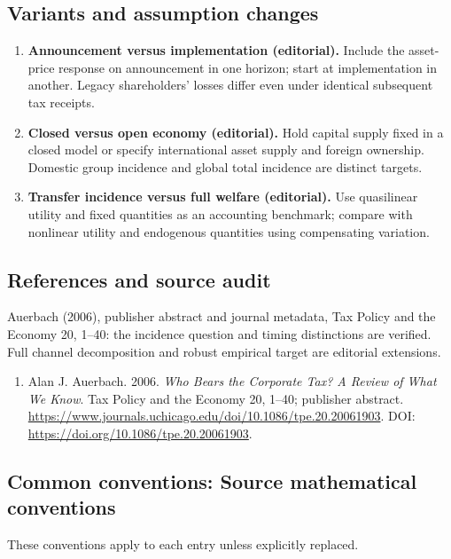 \documentclass[11pt,a4paper]{article}
\begin{document}
\subsection*{Variants and assumption changes}
\begin{enumerate}
\item \textbf{Announcement versus implementation (editorial).} Include the asset-price response on announcement in one horizon; start at implementation in another. Legacy shareholders' losses differ even under identical subsequent tax receipts.
\item \textbf{Closed versus open economy (editorial).} Hold capital supply fixed in a closed model or specify international asset supply and foreign ownership. Domestic group incidence and global total incidence are distinct targets.
\item \textbf{Transfer incidence versus full welfare (editorial).} Use quasilinear utility and fixed quantities as an accounting benchmark; compare with nonlinear utility and endogenous quantities using compensating variation.
\end{enumerate}
\subsection*{References and source audit}
Auerbach (2006), publisher abstract and journal metadata, Tax Policy and the Economy 20, 1--40: the incidence question and timing distinctions are verified. Full channel decomposition and robust empirical target are editorial extensions.
\begin{enumerate}\raggedright
\item\hypertarget{definitions:source:30007756:1}{} Alan J. Auerbach. 2006. \emph{Who Bears the Corporate Tax? A Review of What We Know}. Tax Policy and the Economy 20, 1–40; publisher abstract.
\url{https://www.journals.uchicago.edu/doi/10.1086/tpe.20.20061903}.
DOI: \url{https://doi.org/10.1086/tpe.20.20061903}.
\end{enumerate}

\subsection*{Common conventions: Source mathematical conventions}

These conventions apply to each entry unless explicitly replaced.
\end{document}
